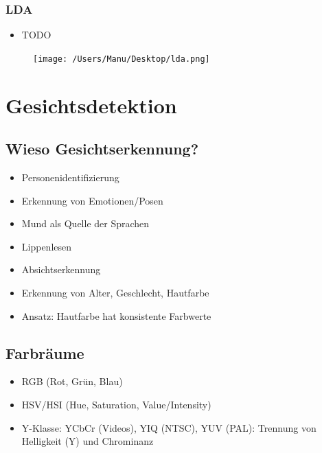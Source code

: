 \documentclass[paper=a4, fontsize=11pt]{scrartcl} %
\numberwithin{equation}{section} %
\numberwithin{figure}{section} %
\numberwithin{table}{section} %
\begin{document}
\subsubsection{LDA}

\begin{minipage}{0.6\textwidth}
\begin{itemize}
\item TODO
\end{itemize}
\end{minipage} \hfill
\begin{minipage}{0.35\textwidth}
\begin{figure}[H]
\texttt{[image: /Users/Manu/Desktop/lda.png]}
\end{figure}
\end{minipage}

\section{Gesichtsdetektion}

\subsection{Wieso Gesichtserkennung?}

\begin{itemize}
\item Personenidentifizierung
\item Erkennung von Emotionen/Posen
\item Mund als Quelle der Sprachen
\item Lippenlesen
\item Absichtserkennung
\item Erkennung von Alter, Geschlecht, Hautfarbe
\item Ansatz: Hautfarbe hat konsistente Farbwerte
\end{itemize}

\subsection{Farbräume}

\begin{itemize}
\item RGB (Rot, Grün, Blau)
\item HSV/HSI (Hue, Saturation, Value/Intensity)
\item Y-Klasse: YCbCr (Videos), YIQ (NTSC), YUV (PAL): Trennung von Helligkeit (Y) und Chrominanz
\end{itemize}
\end{document}
